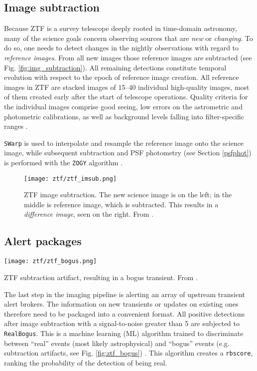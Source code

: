 \subsection{Image subtraction} \label{ztf_image_subtraction}
Because ZTF is a survey telescope deeply rooted in time-domain astronomy, many of the science goals concern observing sources that are \textit{new} or \textit{changing}. To do so, one needs to detect changes in the nightly observations with regard to \textit{reference images}. From all new images those reference images are subtracted (see Fig. \ref{fig:img_subtraction}). All remaining detections constitute temporal evolution with respect to the epoch of reference image creation. All reference images in ZTF are stacked images of 15--40 individual high-quality images, most of them created early after the start of telescope operations. Quality criteria for the individual images comprise good seeing, low errors on the astrometric and photometric calibrations, as well as background levels falling into filter-specific ranges \cite{Masci2019}.

\texttt{SWarp}  is used to interpolate and resample the reference image onto the science image, while subsequent subtraction and PSF photometry (see Section \ref{psfphot}) is performed with the \texttt{ZOGY} algorithm .

\begin{figure}[h!]
    \texttt{[image: ztf/ztf\_imsub.png]}
    \caption[ZTF image subtraction]{ZTF image subtraction. The new science image is on the left; in the middle is reference image, which is subtracted. This results in a \textit{difference image}, seen on the right. From \cite{Mahabal2019}.}
\end{figure}

\subsection{Alert packages} \label{ztf_alerts}
\begin{marginfigure}
    \texttt{[image: ztf/ztf\_bogus.png]}
    \caption[ZTF subtraction artifact]{ZTF subtraction artifact, resulting in a bogus transient. From \cite{Mahabal2019}.}
\end{marginfigure}

The last step in the imaging pipeline is alerting an array of upstream transient alert brokers. The information on new transients or updates on existing ones therefore need to be packaged into a convenient format. All positive detections after image subtraction with a signal-to-noise greater than 5 are subjected to \texttt{RealBogus}. This is a machine learning (ML) algorithm trained to discriminate between ``real'' events (most likely astrophysical) and ``bogus'' events (e.g. subtraction artifacts, see Fig. \ref{fig:ztf_bogus}) . This algorithm creates a \texttt{rbscore}, ranking the probability of the detection of being real.

